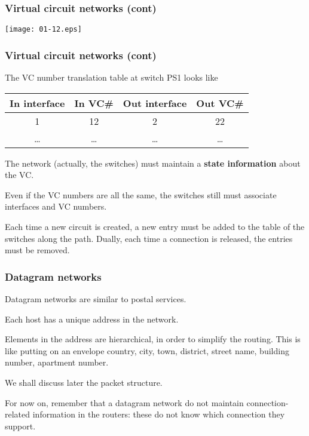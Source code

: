 %
\begin{frame}
\frametitle{Virtual circuit networks (cont)}

\begin{center}
  \texttt{[image: 01-12.eps]}
\end{center}
 
\end{frame}

%
\begin{frame}
\frametitle{Virtual circuit networks (cont)}

The VC number translation table at switch PS1 looks like

\bigskip

\begin{tabular}{cccc}
  In interface
& In VC\#
& Out interface
& Out VC\#\\
\hline
1 & 12 & 2 & 22\\
\ldots & \ldots & \ldots & \ldots
\end{tabular}

\bigskip

The network (actually, the switches) must maintain a \textbf{state
information} about the VC.

\bigskip

Even if the VC numbers are all the same, the switches still must
associate interfaces and VC numbers.

\bigskip

Each time a new circuit is created, a new entry must be added to the
table of the switches along the path. Dually, each time a connection
is released, the entries must be removed.

\end{frame}

%
\begin{frame}
\frametitle{Datagram networks}

Datagram networks are similar to postal services.

\bigskip

Each host has a unique address in the network.

\bigskip

Elements in the address are hierarchical, in order to simplify the
routing. This is like putting on an envelope country, city, town,
district, street name, building number, apartment number.

\bigskip

We shall discuss later the packet structure.

\bigskip

For now on, remember that a datagram network do not maintain
connection-related information in the routers: these do not know which
connection they support.

\end{frame}

